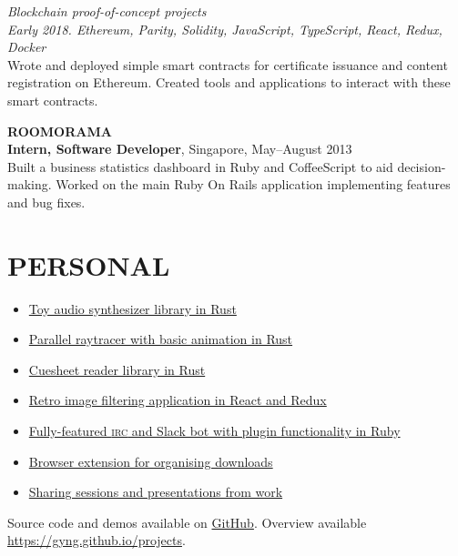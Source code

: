 \documentclass[line, margin]{res}
\begin{document}
\begin{resume}
        \textit{Blockchain proof-of-concept projects} \\
        \textit{Early 2018. Ethereum, Parity, Solidity, JavaScript, TypeScript, React, Redux, Docker} \\
        Wrote and deployed simple smart contracts for certificate issuance and content registration on Ethereum.
        Created tools and applications to interact with these smart contracts.

        \textbf{ROOMORAMA} \\
        \textbf{Intern, Software Developer}, Singapore, May--August 2013 \\
        Built a business statistics dashboard in Ruby and CoffeeScript to aid decision-making. Worked on the main Ruby On Rails application implementing features and bug fixes.



    \section{PERSONAL}
        \begin{itemize}[leftmargin=*]
        \item \href{https://github.com/gyng/synthrs}{Toy audio synthesizer library in Rust}
        \item \href{https://github.com/gyng/rust-raytracer}{Parallel raytracer with basic animation in Rust}
        \item \href{https://github.com/gyng/rcue}{Cuesheet reader library in Rust}
        \item \href{https://github.com/gyng/ditherer}{Retro image filtering application in React and Redux}
        \item \href{https://github.com/gyng/betabot}{Fully-featured \textsc{irc} and Slack bot with plugin functionality in Ruby}
        \item \href{https://github.com/gyng/save-in}{Browser extension for organising downloads}
        \item \href{https://github.com/gyng/book}{Sharing sessions and presentations from work}
        \end{itemize}

        Source code and demos available on \href{https://github.com/gyng}{GitHub}. Overview available \href{https://gyng.github.io/projects}{https://gyng.github.io/projects}.

\end{resume}
\end{document}
